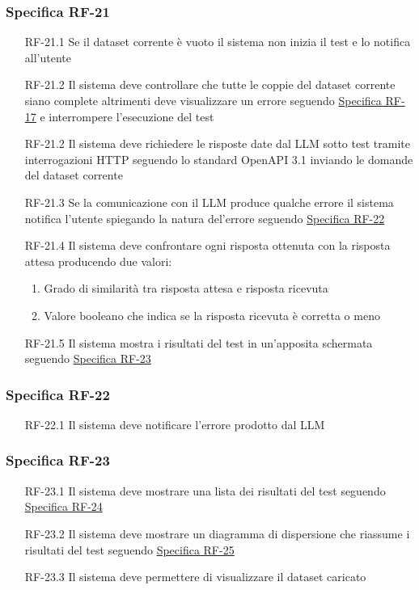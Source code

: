 \subsubsection{Specifica RF-21}
\label{subsubsec:RF-21}
\begin{enumerate}
    \item[RF-21.1] Se il dataset corrente è vuoto il sistema non inizia il test e lo notifica all'utente
    \item[RF-21.2] Il sistema deve controllare che tutte le coppie del dataset corrente siano complete altrimenti deve visualizzare un errore seguendo \hyperref[subsubsec:RF-17]{Specifica RF-17} e interrompere l'esecuzione del test
    \item[RF-21.2] Il sistema deve richiedere le risposte date dal LLM sotto test tramite interrogazioni HTTP seguendo lo standard OpenAPI 3.1 inviando le domande del dataset corrente
    \item[RF-21.3] Se la comunicazione con il LLM produce qualche errore il sistema notifica l'utente spiegando la natura del'errore seguendo \hyperref[subsubsec:RF-22]{Specifica RF-22}
    \item[RF-21.4] Il sistema deve confrontare ogni risposta ottenuta con la risposta attesa producendo due valori:
    \begin{enumerate}
        \item Grado di similarità tra risposta attesa e risposta ricevuta
        \item Valore booleano che indica se la risposta ricevuta è corretta o meno
    \end{enumerate}
    \item[RF-21.5] Il sistema mostra i risultati del test in un'apposita schermata seguendo \hyperref[subsubsec:RF-23]{Specifica RF-23}
\end{enumerate}

\subsubsection{Specifica RF-22}
\label{subsubsec:RF-22}
\begin{enumerate}
    \item[RF-22.1] Il sistema deve notificare l'errore prodotto dal LLM
\end{enumerate}

\subsubsection{Specifica RF-23}
\label{subsubsec:RF-23}
\begin{enumerate}
    \item[RF-23.1] Il sistema deve mostrare una lista dei risultati del test seguendo \hyperref[subsubsec:RF-24]{Specifica RF-24}
    \item[RF-23.2] Il sistema deve mostrare un diagramma di dispersione che riassume i risultati del test seguendo \hyperref[subsubsec:RF-25]{Specifica RF-25}
    \item[RF-23.3] Il sistema deve permettere di visualizzare il dataset caricato
\end{enumerate}

